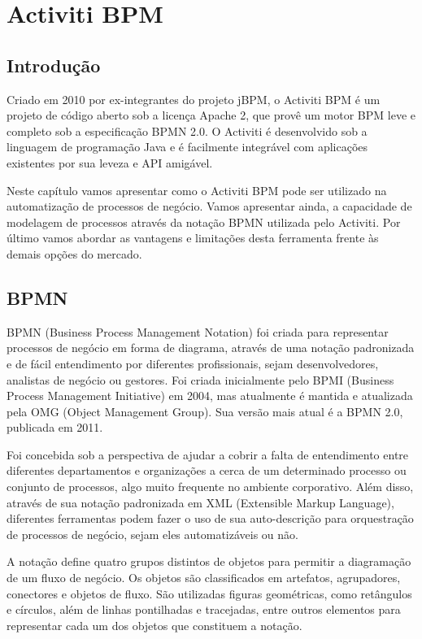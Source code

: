 \chapter{Activiti BPM}\label{chp:LABEL_CHP_4}

\section{Introdução}\label{sec:LABEL_CHP_4_SEC_A}
Criado em 2010 por ex-integrantes do projeto jBPM, o Activiti BPM é um projeto de código aberto sob a licença Apache 2, que provê um motor BPM leve e completo sob a especificação BPMN 2.0. O Activiti é desenvolvido sob a linguagem de programação Java e é facilmente integrável com aplicações existentes por sua leveza e API amigável.

Neste capítulo vamos apresentar como o Activiti BPM pode ser utilizado na automatização de processos de negócio. Vamos apresentar ainda, a capacidade de modelagem de processos através da notação BPMN utilizada pelo Activiti. Por último vamos abordar as vantagens e limitações desta ferramenta frente às demais opções do mercado.

\section{BPMN}\label{sec:LABEL_CHP_4_SEC_B}
BPMN (Business Process Management Notation) foi criada para representar processos de negócio em forma de diagrama, através de uma notação padronizada e de fácil entendimento por diferentes profissionais, sejam desenvolvedores, analistas de negócio ou gestores. Foi criada inicialmente pelo BPMI (Business Process Management Initiative) em 2004, mas atualmente é mantida e atualizada pela OMG (Object Management Group). Sua versão mais atual é a BPMN 2.0, publicada em 2011.

Foi concebida sob a perspectiva de ajudar a cobrir a falta de entendimento entre diferentes departamentos e organizações a cerca de um determinado processo ou conjunto de processos, algo muito frequente no ambiente corporativo. Além disso, através de sua notação padronizada em XML (Extensible Markup Language), diferentes ferramentas podem fazer o uso de sua auto-descrição para orquestração de processos de negócio, sejam eles automatizáveis ou não.

A notação define quatro grupos distintos de objetos para permitir a diagramação de um fluxo de negócio. Os objetos são classificados em artefatos, agrupadores, conectores e objetos de fluxo. São utilizadas figuras geométricas, como retângulos e círculos, além de linhas pontilhadas e tracejadas, entre outros elementos para representar cada um dos objetos que constituem a notação.

